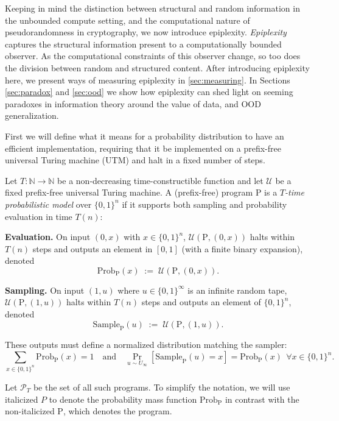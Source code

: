 \documentclass[twoside]{article}
\begin{document}
Keeping in mind the distinction between structural and random information in the unbounded compute setting, and the computational nature of pseudorandomness in cryptography, we now introduce epiplexity. \emph{Epiplexity} captures the structural information present to a computationally bounded observer. As the computational constraints of this observer change, so too does the division between random and structured content. After introducing epiplexity here, we present ways of measuring epiplexity in \autoref{sec:measuring}. In Sections \ref{sec:paradox} and \ref{sec:ood} we show how epiplexity can shed light on seeming paradoxes in information theory around the value of data, and OOD generalization. 
%

%


%

First we will define what it means for a probability distribution to have an efficient implementation, requiring that it be implemented on a prefix-free universal Turing machine (UTM) and halt in a fixed number of steps.

\begin{definition}
\label{def:PT}
Let $T:\mathbb{N}\to\mathbb{N}$ be a non-decreasing time-constructible function and let $\mathcal{U}$ be a fixed prefix-free universal Turing machine.
A (prefix-free) program $\mathrm{P}$ is a \emph{$T$-time probabilistic model} over $\{0,1\}^n$ if it supports both sampling and probability evaluation in time $T(n)$:

\textbf{Evaluation.} On input $(0,x)$ with $x\in\{0,1\}^n$, $\mathcal{U}(\mathrm{P},(0,x))$ halts within $T(n)$ steps
and outputs an element in $[0,1]$ (with a finite binary expansion), denoted
\[
\mathrm{Prob}_{\mathrm{P}}(x)\;:=\;\mathcal{U}(\mathrm{P},(0,x)).
\]

\textbf{Sampling.} On input $(1,u)$ where $u\in\{0,1\}^\infty$ is an infinite random tape,
$\mathcal{U}(\mathrm{P},(1,u))$ halts within $T(n)$ steps and outputs an element of $\{0,1\}^n$, denoted
\[
\mathrm{Sample}_{\mathrm{P}}(u)\;:=\;\mathcal{U}(\mathrm{P},(1,u)).
\]

These outputs must define a normalized distribution matching the sampler:
\[
\sum_{x\in\{0,1\}^n} \mathrm{Prob}_{\mathrm{P}}(x)=1
\quad\text{and}\quad
\Pr_{u\sim U_\infty}[\mathrm{Sample}_{\mathrm{P}}(u)=x]=\mathrm{Prob}_{\mathrm{P}}(x)\ \ \forall x\in\{0,1\}^n.
\]

Let $\mathcal{P}_T$ be the set of all such programs. To simplify the notation, we will use italicized $P$ to denote the probability mass function $\mathrm{Prob}_{\mathrm{P}}$ in contrast with the non-italicized $\mathrm{P}$, which denotes the program.

\end{definition}
\end{document}
